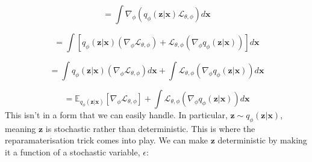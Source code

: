 \documentclass[]{article}
\begin{document}
\begin{equation}
= \int \nabla_{\phi}(q_{\phi}(\mathbf{z}|\mathbf{x}) \mathcal{L}_{\theta, \phi}) d\mathbf{x}
\end{equation}

\begin{equation}
= \int [q_{\phi}(\mathbf{z}|\mathbf{x})(\nabla_{\phi} \mathcal{L}_{\theta, \phi}) + \mathcal{L}_{\theta, \phi} (\nabla_{\phi} q_{\phi}(\mathbf{z}|\mathbf{x}))] d\mathbf{x}
\end{equation}

\begin{equation}
= \int q_{\phi}(\mathbf{z}|\mathbf{x})(\nabla_{\phi} \mathcal{L}_{\theta, \phi}) d\mathbf{x} + \int \mathcal{L}_{\theta, \phi} (\nabla_{\phi} q_{\phi}(\mathbf{z}|\mathbf{x})) d\mathbf{x}
\end{equation}

\begin{equation}
= \mathbb{E}_{q_{\phi}(\mathbf{z}|\mathbf{x})}[\nabla_{\phi} \mathcal{L}_{\theta, \phi}] + \int \mathcal{L}_{\theta, \phi} (\nabla_{\phi} q_{\phi}(\mathbf{z}|\mathbf{x})) d\mathbf{x}
\end{equation}
This isn't in a form that we can easily handle. In particular, $\mathbf{z} \sim q_{\phi}(\mathbf{z}|\mathbf{x})$, meaning $\mathbf{z}$ is stochastic rather than deterministic. This is where the reparamaterisation trick comes into play. We can make $\mathbf{z}$ deterministic by making it a function of a stochastic variable, $\epsilon$:
\end{document}
